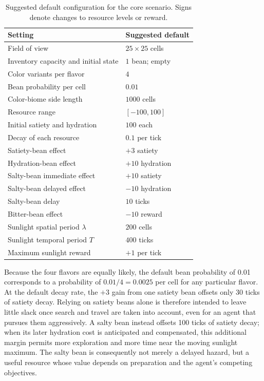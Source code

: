 \documentclass[10pt,journal,compsoc]{IEEEtran}
\begin{document}
\begin{table}[!t]
    \caption{Suggested default configuration for the core scenario.
    Signs denote changes to resource levels or reward.}
    \label{tab:companion-defaults}
    \centering
    \begin{tabularx}{\columnwidth}{
        @{}
        >{\raggedright\arraybackslash}X
        >{\raggedright\arraybackslash}p{}
        @{}
    }
        \toprule
        \textbf{Setting} & \textbf{Suggested default} \\
        \midrule
        Field of view & $25\times25$ cells \\
        Inventory capacity and initial state & $1$ bean; empty \\
        Color variants per flavor & $4$ \\
        Bean probability per cell & $0.01$ \\
        Color-biome side length & $1000$ cells \\
        Resource range & $[-100,100]$ \\
        Initial satiety and hydration & $100$ each \\
        Decay of each resource & $0.1$ per tick \\
        Satiety-bean effect & $+3$ satiety \\
        Hydration-bean effect & $+10$ hydration \\
        Salty-bean immediate effect & $+10$ satiety \\
        Salty-bean delayed effect & $-10$ hydration \\
        Salty-bean delay & $10$ ticks \\
        Bitter-bean effect & $-10$ reward \\
        Sunlight spatial period $\lambda$ & $200$ cells \\
        Sunlight temporal period $T$ & $400$ ticks \\
        Maximum sunlight reward & $+1$ per tick \\
        \bottomrule
    \end{tabularx}
\end{table}

Because the four flavors are equally likely, the default bean probability of 0.01 corresponds to a probability of $0.01/4=0.0025$ per cell for any particular flavor.
At the default decay rate, the $+3$ gain from one satiety bean offsets only 30 ticks of satiety decay.
Relying on satiety beans alone is therefore intended to leave little slack once search and travel are taken into account, even for an agent that pursues them aggressively.
A salty bean instead offsets 100 ticks of satiety decay; when its later hydration cost is anticipated and compensated, this additional margin permits more exploration and more time near the moving sunlight maximum.
The salty bean is consequently not merely a delayed hazard, but a useful resource whose value depends on preparation and the agent's competing objectives.
\end{document}
